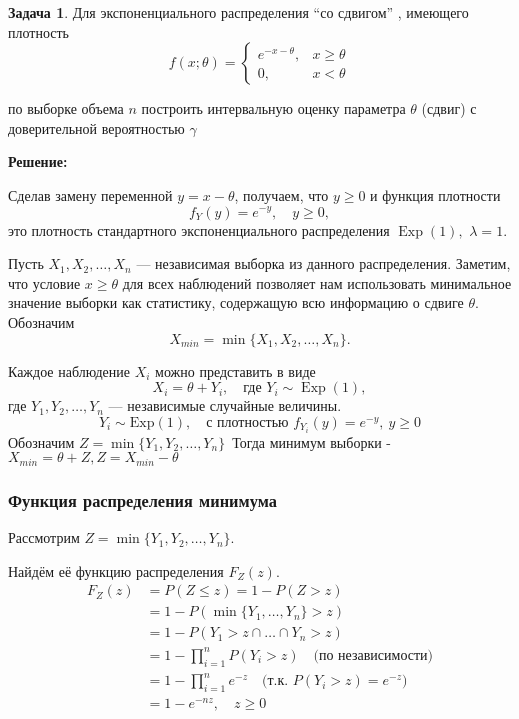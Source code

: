 \documentclass[a4paper,11pt]{article}
\newenvironment{shdd}{\begin{mdframed}[backgroundcolor=shadecolor]}{\end{mdframed}}
\theoremstyle{definition}
\newtheorem{problem}{Задача}\setlength{\parindent}{0pt}
\newenvironment{solution}
{\begin{shdd}\textbf{Решение:}\par\setlength{\parindent}{0pt}}
{\end{shdd}}
\begin{document}
\vspace{10pt}
\begin{problem}
    Для экспоненциального распределения “со сдвигом” , имеющего плотность
    \begin{equation}
        f(x; \theta) = 
        \begin{cases}
            e^{-x-\theta}, & x\geq\theta \\
            0, &x<\theta
        \end{cases}\label{eq:equation}
    \end{equation}
    
    по выборке объема \(n\) построить интервальную оценку параметра \(\theta\) (сдвиг) с доверительной
    вероятностью \(\gamma\)
    \begin{solution}
        Сделав замену переменной \(y=x-\theta\), получаем, что \(y\ge0\) и функция плотности
        \[
        f_Y(y)= e^{-y},\quad y \ge 0,
        \]
        это плотность стандартного экспоненциального распределения \( \operatorname{Exp}(1), \) \( \lambda = 1 \).
    
        Пусть \(X_1, X_2, \dots, X_n\) — независимая выборка из данного распределения. Заметим, что условие \(x \ge \theta\) 
        для всех наблюдений позволяет нам использовать минимальное значение выборки как статистику, содержащую всю информацию 
        о сдвиге \(\theta\). Обозначим
        \[
        X_{min} = \min\{X_1, X_2, \dots, X_n\}.
        \]
    
        Каждое наблюдение \(X_i\) можно представить в виде
        \[
        X_i = \theta + Y_i,\quad \text{где } Y_i\sim \operatorname{Exp}(1),
        \]
        где $Y_1, Y_2, \dots, Y_n$ — независимые случайные величины.
        \[
        Y_i \sim \mathrm{Exp}(1), \quad \text{с плотностью } f_{Y_i}(y) = e^{-y}, \ y \geq 0
        \]
        Обозначим \( Z = \min\{Y_1, Y_2, \dots, Y_n\} \)\
        Тогда минимум выборки - \( X_{min} = \theta + Z, Z = X_{min} - \theta\)

        \subsubsection*{Функция распределения минимума}
        Рассмотрим $Z = \min\{Y_1, Y_2, \dots, Y_n\}$.

        Найдём её функцию распределения $F_Z(z)$.
        \begin{align*}
        F_Z(z) &= P(Z \leq z) = 1 - P(Z > z) \\
        &= 1 - P(\min\{Y_1, \dots, Y_n\} > z) \\
        &= 1 - P(Y_1 > z \cap \dots \cap Y_n > z) \\
        &= 1 - \prod_{i=1}^n P(Y_i > z) \quad \text{(по независимости)} \\
        &= 1 - \prod_{i=1}^n e^{-z} \quad \text{(т.к. } P(Y_i > z) = e^{-z}) \\
        &= 1 - e^{-nz}, \quad z \geq 0
        \end{align*}


\end{solution}
\end{problem}
\end{document}
